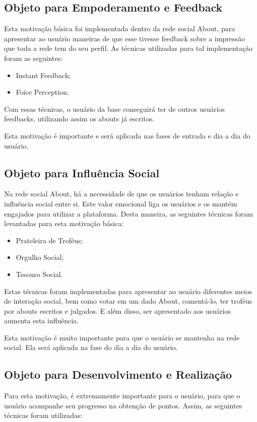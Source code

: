 \subsection{Objeto para Empoderamento e Feedback}
\label{sub:objeto_empoderamento_feedback}
Esta motivação básica foi implementada dentro da rede social About, para apresentar
ao usuário maneiras de que esse tivesse feedback sobre a impressão que toda a rede
tem do seu perfil. As técnicas utilizadas para tal implementação foram as seguintes:

\begin{itemize}
    \item Instant Feedback;
    \item Foice Perception.
\end{itemize}

Com essas técnicas, o usuário da base conseguirá ter de outros usuários feedbacks,
utilizando assim os abouts já escritos.

Esta motivação é importante e será aplicada nas fases de entrada e dia a dia do usuário.

\subsection{Objeto para Influência Social}
\label{sub:objeto_influencia_social}
Na rede social About, há a necessidade de que os usuários tenham relação e influência
social entre si. Este valor emocional liga os usuários e os mantém engajados para utilizar
a plataforma. Desta maneira, as seguintes técnicas foram levantadas para esta motivação
básica:

\begin{itemize}
    \item Prateleira de Troféus;
    \item Orgulho Social;
    \item Tesouro Social.
\end{itemize}

Estas técnicas foram implementadas para apresentar ao usuário diferentes meios de interação
social, bem como votar em um dado About, comentá-lo, ter troféus por abouts escritos e julgados. 
E além disso, ser apresentado aos usuários aumenta esta influência.

Esta motivação é muito importante para que o usuário se mantenha na rede social. Ela será aplicada
na fase do dia a dia do usuário.

\subsection{Objeto para Desenvolvimento e Realização}
\label{sub:objeto_desenvolvimento_e_realizacao}
Para esta motivação, é extremamente importante para o usuário, para que o usuário acompanhe seu progresso
na obtenção de pontos. Assim, as seguintes técnicas foram utilizadas:

